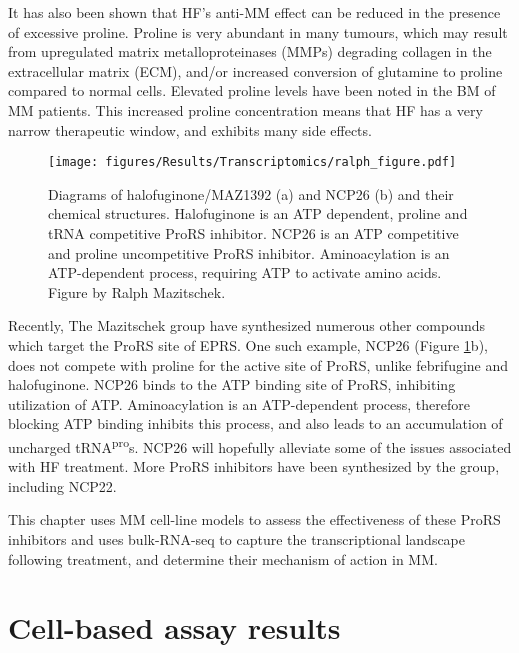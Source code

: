 It has also been shown that HF's anti-MM effect can be reduced in the presence of excessive proline\cite{leiba2012halofuginone}.
Proline is very abundant in many tumours, which may result from upregulated matrix metalloproteinases (MMPs) degrading collagen in the extracellular matrix (ECM), and/or increased conversion of glutamine to proline compared to normal cells\cite{liu2013mirna}.
Elevated proline levels have been noted in the BM of MM patients\cite{fei2021metabolic}.
This increased proline concentration means that HF has a very narrow therapeutic window, and exhibits many side effects.

\begin{figure}[ht]
    \centering
    \texttt{[image: figures/Results/Transcriptomics/ralph\_figure.pdf]}
    \caption[Halofuginone and NCP26 structures]{Diagrams of halofuginone/MAZ1392 (a) and NCP26 (b) and their chemical structures.
    Halofuginone is an ATP dependent, proline and tRNA competitive ProRS inhibitor.
    NCP26 is an ATP competitive and proline uncompetitive ProRS inhibitor.
    Aminoacylation is an ATP-dependent process, requiring ATP to activate amino acids.
    Figure by Ralph Mazitschek.}
    \label{fig:ralph_diagrams}
\end{figure}

Recently, The Mazitschek group have synthesized numerous other compounds which target the ProRS site of EPRS.
One such example, NCP26 (Figure \ref{fig:ralph_diagrams}b), does not compete with proline for the active site of ProRS, unlike febrifugine and halofuginone.
NCP26 binds to the ATP binding site of ProRS, inhibiting utilization of ATP\@.
Aminoacylation is an ATP-dependent process, therefore blocking ATP binding inhibits this process, and also leads to an accumulation of uncharged tRNA\textsuperscript{pro}s.
NCP26 will hopefully alleviate some of the issues associated with HF treatment.
More ProRS inhibitors have been synthesized by the group, including NCP22.

This chapter uses MM cell-line models to assess the effectiveness of these ProRS inhibitors and uses bulk-RNA-seq to capture the transcriptional landscape following treatment, and determine their mechanism of action in MM\@.

\clearpage

\section{Cell-based assay results}
